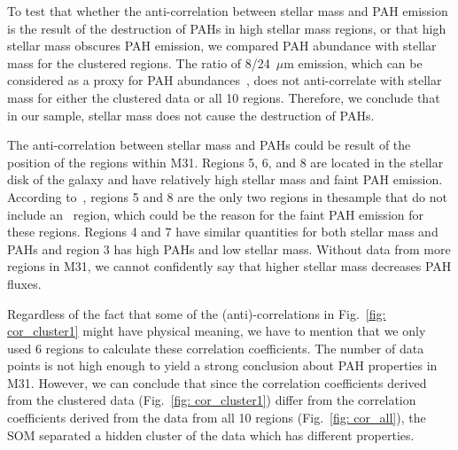         To test that whether the anti-correlation between stellar mass and PAH emission is the result of the destruction of PAHs in high stellar mass regions, or that high stellar mass obscures PAH emission, we compared PAH abundance with stellar mass for the clustered regions.
        The ratio of 8/24~$\mu$m emission, which can be considered as a proxy for PAH abundances~\citep[e.g.][]{Sandstrom10,Khramtsova13}, does not anti-correlate with stellar mass for either the clustered data or all 10 regions.
        Therefore, we conclude that in our sample, stellar mass does not cause the destruction of PAHs.
        
        The anti-correlation between stellar mass and PAHs could be result of the position of the regions within M31.
        Regions 5, 6, and 8 are located in the stellar disk of the galaxy and have relatively high stellar mass and faint PAH emission. 
        According to~\cite{Dim15}, regions 5 and 8 are the only two regions in thesample that do not include an \hii~region, which could be the reason for the faint PAH emission for these regions.
        Regions 4 and 7 have similar quantities for both stellar mass and PAHs and region 3 has high PAHs and low stellar mass.
        Without data from more regions in M31, we cannot confidently say that higher stellar mass decreases PAH fluxes.
        
        
       Regardless of the fact that some of the (anti)-correlations in Fig.~\ref{fig: cor_cluster1} might have physical meaning, we have to mention that we only used 6 regions to calculate these correlation coefficients.
       The number of data points is not high enough to yield a strong conclusion about PAH properties in M31.
       However, we can conclude that since the correlation coefficients derived from the clustered data (Fig.~\ref{fig: cor_cluster1}) differ from the correlation coefficients derived from the data from all 10 regions (Fig.~\ref{fig: cor_all}), the SOM separated a hidden cluster of the data which has different properties.
        
        
        
